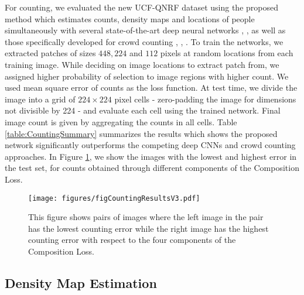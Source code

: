 \documentclass[runningheads]{llncs}
\begin{document}
For counting, we evaluated the new UCF-QNRF dataset using the proposed method which estimates counts, density maps and locations of people simultaneously with several state-of-the-art deep neural networks \cite{badrinarayanan2015segnet}, \cite{he2016deep}, \cite{huang2016densely} as well as those specifically developed for crowd counting \cite{zhang2016single}, \cite{sindagi2017cnn}, \cite{sam2017switching}. To train the networks, we extracted patches of sizes $448, 224$ and $112$ pixels at random locations from each training image. While deciding on image locations to extract patch from, we assigned higher probability of selection to image regions with higher count. We used mean square error of counts as the loss function. At test time, we divide the image into a grid of $224 \times 224$ pixel cells - zero-padding the image for dimensions not divisible by 224 - and evaluate each cell using the trained network. Final image count is given by aggregating the counts in all cells. Table \ref{table:CountingSummary} summarizes the results which shows the proposed network significantly outperforms the competing deep CNNs and crowd counting approaches. In Figure \ref{fig:regResult}, we show the images with the lowest and highest error in the test set, for counts obtained through different components of the Composition Loss.



\begin{comment}
\begin{figure}[t]
\centering
\texttt{[image: figures/regPipeline.pdf]}
\caption{Training for regression pipeline. Classification CNN is modified to do regression. Patch of size 600x600 pixels is extracted and resized to 224x224 before feeding to the network. We evaluated our dataset for regression on 4 different CNN architectures}
\label{fig:regressionPipelinie}
\end{figure}
\end{comment}

\begin{figure}[t]
\centering
\texttt{[image: figures/figCountingResultsV3.pdf]}
\caption{{This figure shows pairs of images where the left image in the pair has the lowest counting error while the right image has the highest counting error with respect to the four components of the Composition Loss.}}
\label{fig:regResult}
\end{figure}



\subsection{Density Map Estimation}\label{subsecDensityEstimation}
\end{document}
